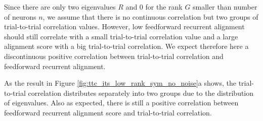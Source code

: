 \documentclass[11pt]{article}
\begin{document}
	Since there are only two eigenvalues $R$ and $0$ for the rank $G$ smaller than number of neurons $n$, we assume that there is no continuous correlation but two groups of trial-to-trial correlation values. However, low feedforward recurrent alignment should still correlate with a small trial-to-trial correlation value and a large alignment score with a big trial-to-trial correlation. We expect therefore here a discontinuous positive correlation between trial-to-trial correlation and feedforward recurrent alignment. 
	
	As the result in Figure \ref{fig:ttc_its_low_rank_sym_no_noise}a shows, the trial-to-trial correlation distributes separately into two groups due to the distribution of eigenvalues. Also as expected, there is still a positive correlation between feedforward recurrent alignment score and trial-to-trial correlation.
	
\end{document}
